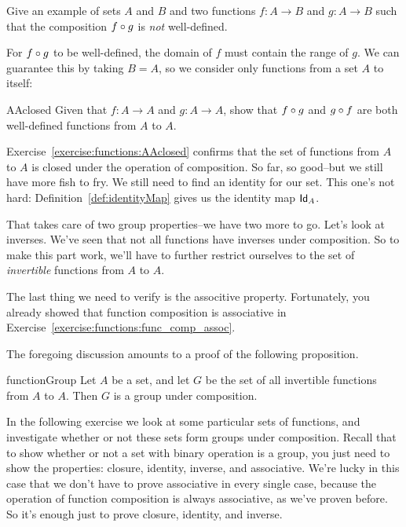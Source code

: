 \begin{exercise}{}
Give an example of sets $A$ and $B$ and two functions $f: A \rightarrow B$ and $g: A \rightarrow B$ such that the composition $f \circ g$ is \emph{not} well-defined.
\end{exercise}

For $f \circ g$ to be well-defined,  the domain of $f$ must contain the range of $g$. We can guarantee this by taking $B=A$, so we consider only functions from a set $A$ to itself:

\begin{exercise}{AAclosed}
Given that $f: A \rightarrow A$ and $g: A \rightarrow A$, show that $f \circ g$ and $g \circ f$  are both  well-defined functions from $A$ to $A$.
\end{exercise}

Exercise~\ref{exercise:functions:AAclosed} confirms that  the set of functions from $A$ to $A$ is closed under the operation of composition.
So far, so good--but we still have more fish to fry. We still need to find an identity for our set.  This one's not hard: Definition~\ref{def:identityMap} gives us the identity map ${\sf Id}_A$. 

That takes care of two group properties--we have two more to go. Let's look at inverses. We've seen that not all functions have inverses under composition. So to make this part work, we'll have to further restrict ourselves to the set of \emph{invertible} functions from $A$ to $A$.

The last thing we need to verify is the associtive property. Fortunately, you already showed that function composition is associative in Exercise~\ref{exercise:functions:func_comp_assoc}.

The foregoing discussion amounts to a proof of the following proposition.

\begin{prop}{functionGroup}
Let $A$ be a set, and let $G$ be the set of all invertible functions from $A$ to $A$. Then $G$ is a group under composition.
\end{prop}

In the following exercise we look at some particular sets of functions, and investigate whether or not these sets form groups under composition. Recall that to show whether or not a set with binary operation is a group, you just need to show the properties: closure, identity, inverse, and associative. We're lucky in this case that we don't have to prove associative in every single case, because the operation of function composition is always associative, as we've proven before. So it's enough just to prove closure, identity, and inverse.

